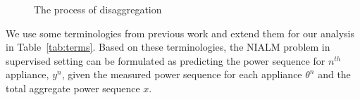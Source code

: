 \documentclass[conference]{IEEEtran}
\newcommand{\tabref}[1]{Table~\ref{#1}}
\begin{document}
\begin{figure} 
	
  	\caption{The process of disaggregation}
    \label{fig:disagg}
\end{figure}
We use some terminologies from previous work \cite{redd,parson2012_aaai,hart} and extend them for our analysis in \tabref{tab:terms}. Based on these terminologies, the NIALM problem in supervised setting can be formulated as predicting the power sequence for $n^{th}$ appliance, $y^n$, given the measured power sequence for each appliance $\theta^n$ and the total aggregate power sequence $x$.
\end{document}
